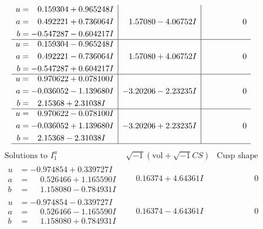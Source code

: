 \documentclass[1p]{elsarticle_modified}
\theoremstyle{definition}
\newcommand{\I}{\sqrt{-1}}
\begin{document}
$$\begin{array}{c|c|c}
\begin{aligned}
u &= \phantom{-}0.159304 + 0.965248 I \\
a &= \phantom{-}0.492221 + 0.736064 I \\
b &= -0.547287 - 0.604217 I\end{aligned}
 & \phantom{-}1.57080 - 4.06752 I & \phantom{-0.000000 } 0 \\ \hline\begin{aligned}
u &= \phantom{-}0.159304 - 0.965248 I \\
a &= \phantom{-}0.492221 - 0.736064 I \\
b &= -0.547287 + 0.604217 I\end{aligned}
 & \phantom{-}1.57080 + 4.06752 I & \phantom{-0.000000 } 0 \\ \hline\begin{aligned}
u &= \phantom{-}0.970622 + 0.078100 I \\
a &= -0.036052 - 1.139680 I \\
b &= \phantom{-}2.15368 + 2.31038 I\end{aligned}
 & -3.20206 - 2.23235 I & \phantom{-0.000000 } 0 \\ \hline\begin{aligned}
u &= \phantom{-}0.970622 - 0.078100 I \\
a &= -0.036052 + 1.139680 I \\
b &= \phantom{-}2.15368 - 2.31038 I\end{aligned}
 & -3.20206 + 2.23235 I & \phantom{-0.000000 } 0\\
 \hline 
 \end{array}$$\newpage$$\begin{array}{c|c|c}  
\text{Solutions to }I^u_{1}& \I (\text{vol} + \sqrt{-1}CS) & \text{Cusp shape}\\
 \hline 
\begin{aligned}
u &= -0.974854 + 0.339727 I \\
a &= \phantom{-}0.526466 + 1.165590 I \\
b &= \phantom{-}1.158080 - 0.784931 I\end{aligned}
 & \phantom{-}0.16374 + 4.64361 I & \phantom{-0.000000 } 0 \\ \hline\begin{aligned}
u &= -0.974854 - 0.339727 I \\
a &= \phantom{-}0.526466 - 1.165590 I \\
b &= \phantom{-}1.158080 + 0.784931 I\end{aligned}
 & \phantom{-}0.16374 - 4.64361 I & \phantom{-0.000000 } 0 \\ \hline\begin{aligned}

\end{aligned}
\end{array}$$
\end{document}
